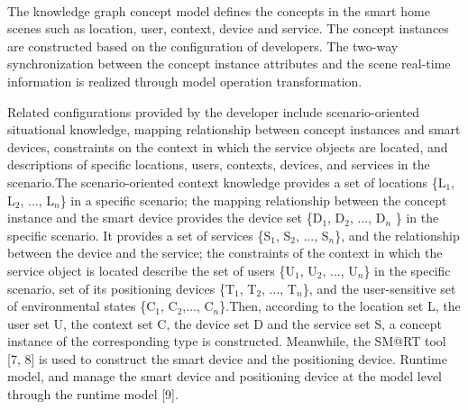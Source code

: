 \paragraph{}
The knowledge graph concept model defines the concepts in the smart home scenes such as location, user, context, device and service. The concept instances are constructed based on the configuration of developers. The two-way synchronization between the concept instance attributes and the scene real-time information is realized through model operation transformation.



Related configurations provided by the developer include scenario-oriented situational knowledge, mapping relationship between concept instances and smart devices, constraints on the context in which the service objects are located, and descriptions of specific locations, users, contexts, devices, and services in the scenario.The scenario-oriented context knowledge provides a set of locations \{L$_{1}$, L$_{2}$, ..., L$_{n}$\} in a specific scenario; the mapping relationship between the concept instance and the smart device provides the device set \{D$_{1}$, D$_{2}$, ..., D$_{n}$ \} in the specific scenario. It provides a set of services \{S$_{1}$, S$_{2}$, ..., S$_{n}$\}, and the relationship between the device and the service; the constraints of the context in which the service object is located describe the set of users \{U$_{1}$, U$_{2}$, ..., U$_{n}$\} in the specific scenario, set of its positioning devices \{T$_{1}$, T$_{2}$, ..., T$_{n}$\}, and the user-sensitive set of environmental states \{C$_{1}$, C$_{2}$,..., C$_{n}$\}.Then, according to the location set L, the user set U, the context set C, the device set D and the service set S, a concept instance of the corresponding type is constructed. Meanwhile, the SM@RT tool [7, 8] is used to construct the smart device and the positioning device. Runtime model, and manage the smart device and positioning device at the model level through the runtime model [9].

